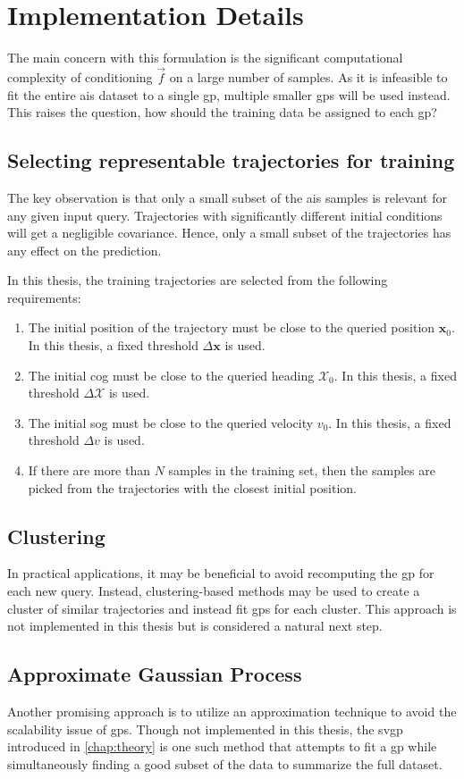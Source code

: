 \section{Implementation Details}

The main concern with this formulation is the significant computational complexity of conditioning $\vec{f}$ on a large number of samples. As it is infeasible to fit the entire \acrshort{ais} dataset to a single \acrshort{gp}, multiple smaller \acrshort{gp}s will be used instead. This raises the question, how should the training data be assigned to each \acrshort{gp}?

\subsection{Selecting representable trajectories for training}
The key observation is that only a small subset of the \acrshort{ais} samples is relevant for any given input query. Trajectories with significantly different initial conditions will get a negligible covariance. Hence, only a small subset of the trajectories has any effect on the prediction. 

In this thesis, the training trajectories are selected from the following requirements:
\begin{enumerate}
    \item The initial position of the trajectory must be close to the queried position $\boldsymbol{x}_0$. In this thesis, a fixed threshold $\Delta \boldsymbol{x}$ is used.
    \item The initial \acrshort{cog} must be close to the queried heading $\mathcal{X}_0$. In this thesis, a fixed threshold $\Delta \mathcal{X}$ is used.
    \item The initial \acrshort{sog} must be close to the queried velocity $v_0$. In this thesis, a fixed threshold $\Delta v$ is used.
    \item If there are more than $N$ samples in the training set, then the samples are picked from the trajectories with the closest initial position.
\end{enumerate}

\subsection{Clustering}
In practical applications, it may be beneficial to avoid recomputing the \acrshort{gp} for each new query. Instead, clustering-based methods may be used to create a cluster of similar trajectories and instead fit \acrshort{gp}s for each cluster. This approach is not implemented in this thesis but is considered a natural next step.


\subsection{Approximate Gaussian Process}
Another promising approach is to utilize an approximation technique to avoid the scalability issue of \acrshort{gp}s. Though not implemented in this thesis, the \acrshort{svgp} introduced in \cref{chap:theory} is one such method that attempts to fit a \acrshort{gp} while simultaneously finding a good subset of the data to summarize the full dataset.

